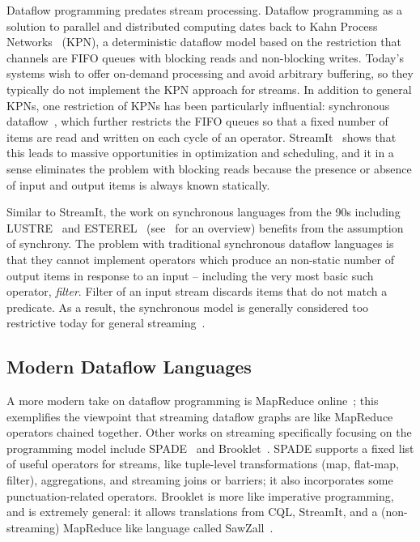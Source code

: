 Dataflow programming predates stream processing.
Dataflow programming as a solution to parallel and distributed computing
dates back to Kahn Process Networks~\cite{gilles1974semantics} (KPN), a deterministic dataflow model based on the restriction that channels are FIFO queues with blocking reads and non-blocking writes. Today's systems wish to offer on-demand processing and avoid arbitrary buffering, so they typically do not implement the KPN approach for streams.
In addition to general KPNs, one restriction of KPNs has been particularly influential: synchronous dataflow~\cite{lee1987synchronous}, which further restricts the FIFO queues so that a fixed number of items are read and written on each cycle of an operator. StreamIt~\cite{thies2002streamit} shows that this leads to massive opportunities in optimization and scheduling, and it in a sense eliminates the problem with blocking reads because the presence or absence of input and output items is always known statically.

Similar to StreamIt,
the work on synchronous languages from the 90s including LUSTRE~\cite{halbwachs1991synchronous} and ESTEREL~\cite{berry1992esterel} (see~\cite{BCEHlGdS2003SL} for an overview) benefits from the assumption of
synchrony.
The problem with traditional synchronous dataflow languages is that they cannot implement operators which produce an non-static number of output items in response to an input -- including the very most basic such operator, \emph{filter}. Filter of an input stream discards items that do not match a predicate. As a result, the synchronous model is generally considered too restrictive today for general streaming~\cite{schneider2013safe}.

\subsection{Modern Dataflow Languages}

A more modern take on dataflow programming is MapReduce online~\cite{condie2010mapreduce}; this exemplifies the viewpoint that streaming dataflow graphs are like MapReduce operators chained together.
Other works on streaming specifically focusing on the programming model include SPADE~\cite{gedik2008spade} and Brooklet~\cite{soule2010universal}.
SPADE supports a fixed list of useful operators for streams, like tuple-level transformations (map, flat-map, filter), aggregations, and streaming joins or barriers; it also incorporates some punctuation-related operators.
Brooklet is more like imperative programming,
and is extremely general: it allows translations from CQL, StreamIt, and a (non-streaming) MapReduce like language called SawZall~\cite{pike2005interpreting}.

